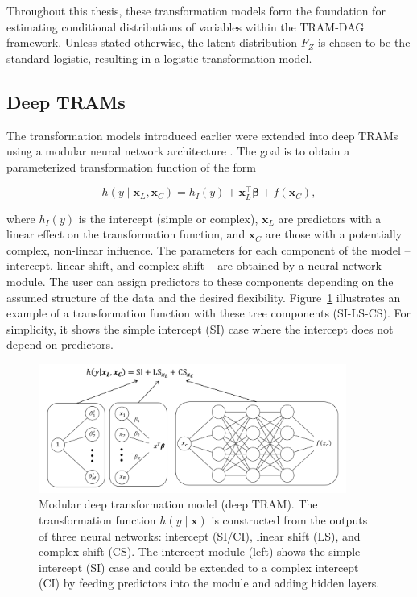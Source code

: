 Throughout this thesis, these transformation models form the foundation for estimating conditional distributions of variables within the TRAM-DAG framework. Unless stated otherwise, the latent distribution $F_Z$ is chosen to be the standard logistic, resulting in a logistic transformation model.



\subsection{Deep TRAMs} \label{sec:deep_trams}

The transformation models introduced earlier were extended into deep TRAMs using a modular neural network architecture \citep{sick2020}. The goal is to obtain a parameterized transformation function of the form

\begin{equation}
h(y \mid \mathbf{x}_L, \mathbf{x}_C ) = h_I(y) + \mathbf{x}_L^\top \boldsymbol{\beta} + f(\mathbf{x}_C),
\label{eq:deep_tram_old}
\end{equation}

where $h_I(y)$ is the intercept (simple or complex), $\mathbf{x}_{L}$ are predictors with a linear effect on the transformation function, and $\mathbf{x}_{C}$ are those with a potentially complex, non-linear influence. The parameters for each component of the model -- intercept, linear shift, and complex shift -- are obtained by a neural network module. The user can assign predictors to these components depending on the assumed structure of the data and the desired flexibility. Figure~\ref{fig:deep_tram} illustrates an example of a transformation function with these tree components (SI-LS-CS). For simplicity, it shows the simple intercept (SI) case where the intercept does not depend on predictors.


\begin{figure}[H]
\centering
\includegraphics[width=0.9\textwidth]{img/deep_tram.png}
\caption{Modular deep transformation model (deep TRAM). The transformation function $h(y \mid \mathbf{x})$ is constructed from the outputs of three neural networks: intercept (SI/CI), linear shift (LS), and complex shift (CS). The intercept module (left) shows the simple intercept (SI) case and could be extended to a complex intercept (CI) by feeding predictors into the module and adding hidden layers.}
\label{fig:deep_tram}
\end{figure}


